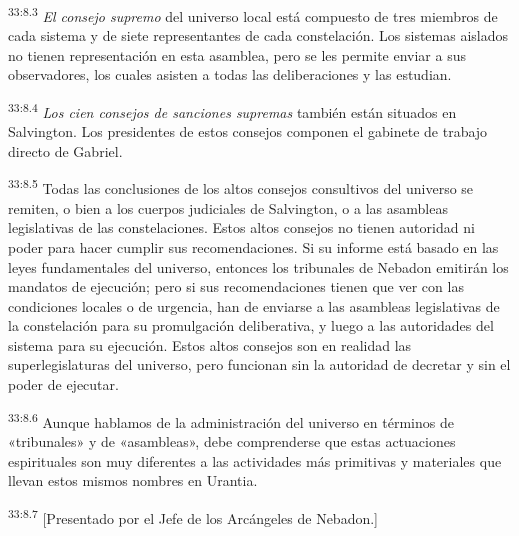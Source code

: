 \par
\textsuperscript{33:8.3} \textit{El consejo supremo} del universo local está compuesto de tres miembros de cada sistema y de siete representantes de cada constelación. Los sistemas aislados no tienen representación en esta asamblea, pero se les permite enviar a sus observadores, los cuales asisten a todas las deliberaciones y las estudian.

\par
\textsuperscript{33:8.4} \textit{Los cien consejos de sanciones supremas} también están situados en Salvington. Los presidentes de estos consejos componen el gabinete de trabajo directo de Gabriel.

\par
\textsuperscript{33:8.5} Todas las conclusiones de los altos consejos consultivos del universo se remiten, o bien a los cuerpos judiciales de Salvington, o a las asambleas legislativas de las constelaciones. Estos altos consejos no tienen autoridad ni poder para hacer cumplir sus recomendaciones. Si su informe está basado en las leyes fundamentales del universo, entonces los tribunales de Nebadon emitirán los mandatos de ejecución; pero si sus recomendaciones tienen que ver con las condiciones locales o de urgencia, han de enviarse a las asambleas legislativas de la constelación para su promulgación deliberativa, y luego a las autoridades del sistema para su ejecución. Estos altos consejos son en realidad las superlegislaturas del universo, pero funcionan sin la autoridad de decretar y sin el poder de ejecutar.

\par
\textsuperscript{33:8.6} Aunque hablamos de la administración del universo en términos de «tribunales» y de «asambleas», debe comprenderse que estas actuaciones espirituales son muy diferentes a las actividades más primitivas y materiales que llevan estos mismos nombres en Urantia.

\par
\textsuperscript{33:8.7} [Presentado por el Jefe de los Arcángeles de Nebadon.]